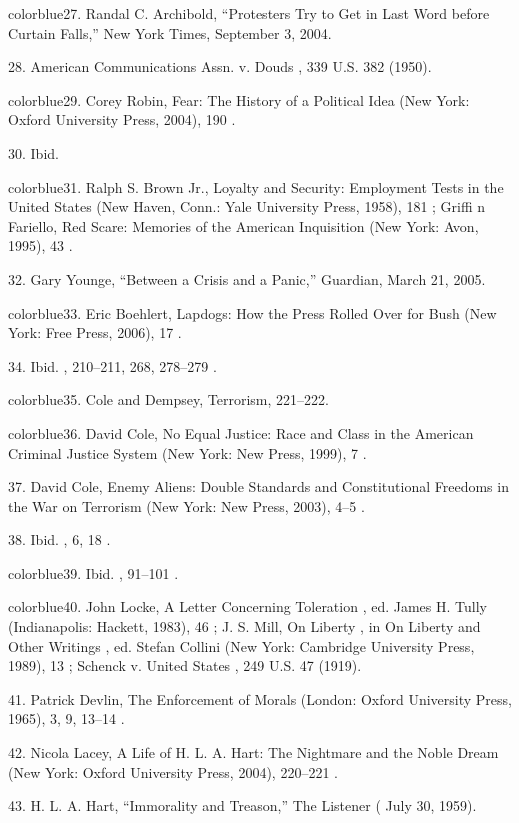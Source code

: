 	{color{blue}27}. Randal C. Archibold, “Protesters Try to Get in Last Word before Curtain Falls,” New York Times, September 3, 2004.


	{\color{blue}28}. American Communications Assn. v. Douds , 339 U.S. 382 (1950).


	{color{blue}29}. Corey Robin, Fear: The History of a Political Idea (New York: Oxford University Press, 2004), 190 .


	{\color{blue}30}. Ibid.


	{color{blue}31}. Ralph S. Brown Jr., Loyalty and Security: Employment Tests in the United States (New Haven, Conn.: Yale University Press, 1958), 181 ; Griffi n Fariello, Red Scare: Memories of the American Inquisition (New York: Avon, 1995), 43 .


	{\color{blue}32}. Gary Younge, “Between a Crisis and a Panic,” Guardian, March 21, 2005.


	{color{blue}33}. Eric Boehlert, Lapdogs: How the Press Rolled Over for Bush (New York: Free Press, 2006), 17 .


	{\color{blue}34}. Ibid. , 210–211, 268, 278–279 .


	{color{blue}35}. Cole and Dempsey, Terrorism, 221–222.


	{color{blue}36}. David Cole, No Equal Justice: Race and Class in the American Criminal Justice System (New York: New Press, 1999), 7 .


	{\color{blue}37}. David Cole, Enemy Aliens: Double Standards and Constitutional Freedoms in the War on Terrorism (New York: New Press, 2003), 4–5 .


	{\color{blue}38}. Ibid. , 6, 18 .


	{color{blue}39}. Ibid. , 91–101 .


	{color{blue}40}. John Locke, A Letter Concerning Toleration , ed. James H. Tully (Indianapolis: Hackett, 1983), 46 ; J. S. Mill, On Liberty , in On Liberty and Other Writings , ed. Stefan Collini (New York: Cambridge University Press, 1989), 13 ; Schenck v. United States , 249 U.S. 47 (1919).


	{\color{blue}41}. Patrick Devlin, The Enforcement of Morals (London: Oxford University Press, 1965), 3, 9, 13–14 .


	{\color{blue}42}. Nicola Lacey, A Life of H. L. A. Hart: The Nightmare and the Noble Dream (New York: Oxford University Press, 2004), 220–221 .


	{\color{blue}43}. H. L. A. Hart, “Immorality and Treason,” The Listener ( July 30, 1959).


